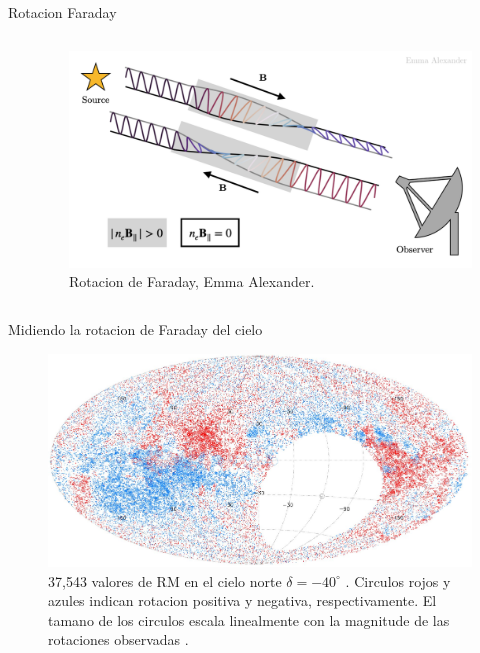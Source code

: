 \documentclass[xetex,aspectratio=169]{beamer}
\begin{document}
\begin{frame}{Rotacion Faraday}
\begin{columns}
\begin{column}{0.55\textwidth}
				
			\end{column}
			
			\begin{column}{0.45\textwidth}
				\begin{figure}
					\centering
					\includegraphics[width=\textwidth, height=\textheight, keepaspectratio]{figures/faraday_rotation/faraday_rot.png}
					\caption*{Rotacion de Faraday, Emma Alexander.}
				\end{figure}
			\end{column}
		\end{columns}
		
	\end{frame}
	
	\begin{frame}{Midiendo la rotacion de Faraday del cielo}
		\begin{figure}
			\centering
			\includegraphics[width=.8\textwidth, keepaspectratio]{./figures/faraday_rotation/taylor.jpg}
			\caption*{37,543 valores de RM en el cielo norte $\delta = -40^\circ$ . Circulos rojos y azules indican rotacion positiva y negativa, respectivamente. El tamano de los circulos escala linealmente con la magnitude de las rotaciones observadas {\protect\autocite{Taylor-2009}}.}
		\end{figure}
	\end{frame}
	
\end{document}
